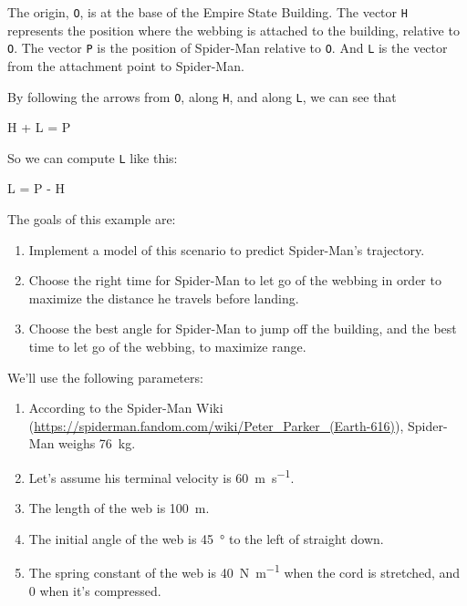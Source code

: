 The origin, {\tt O}, is at the base of the Empire State Building. The
vector {\tt H} represents the position where the webbing is attached
to the building, relative to {\tt O}. The vector {\tt P} is the
position of Spider-Man relative to {\tt O}. And {\tt L} is the
vector from the attachment point to Spider-Man.


By following the arrows from {\tt O}, along {\tt H}, and along
{\tt L}, we can see that

\begin{code}
H + L = P
\end{code}

So we can compute {\tt L} like this:

\begin{code}
L = P - H
\end{code}

The goals of this example are:

\begin{enumerate}

\item
  Implement a model of this scenario to predict Spider-Man's trajectory.


\item
  Choose the right time for Spider-Man to let go of the webbing in order to maximize the distance he travels before landing.


\item
  Choose the best angle for Spider-Man to jump off the building, and the best time to let go of the webbing, to maximize range.

  
\end{enumerate}

We'll use the following parameters:


\begin{enumerate}

\item According to the Spider-Man Wiki (\url{https://spiderman.fandom.com/wiki/Peter_Parker_(Earth-616)}), Spider-Man weighs \SI{76}{\kg}.

\item
  Let's assume his terminal velocity is \SI{60}{\meter\per\second}.


\item
  The length of the web is \SI{100}{\meter}.

\item
  The initial angle of the web is \SI{45}{\degree} to the left of straight
  down.

\item
  The spring constant of the web is \SI{40}{\newton\per\meter} when the cord is stretched, and 0 when it's compressed.
  

\end{enumerate}


